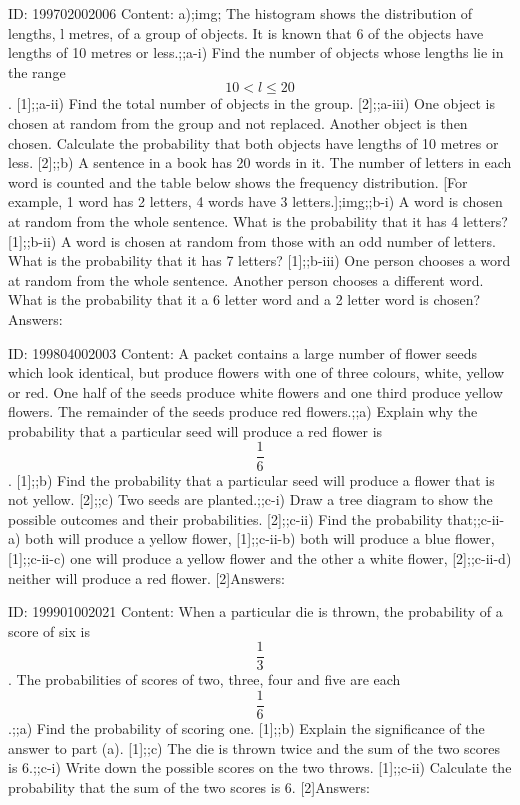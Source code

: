 \documentclass{article}
\begin{document}
ID: 199702002006
Content:
a);img; The histogram shows the distribution of lengths, l metres, of a group of objects. It is 	known that 6 of the objects have lengths of 10 metres or less.;;a-i) Find the number of objects whose lengths lie in the range $$10<l\leq20$$. [1];;a-ii) Find the total number of objects in the group. [2];;a-iii) One object is chosen at random from the group and not replaced. Another object is then chosen. Calculate the probability that both objects have lengths of 10 metres or less. [2];;b) A sentence in a book has 20 words in it. The number of letters in each word is counted and the table below shows the frequency distribution. [For example, 1 word has 2 letters, 4 words have 3 letters.];img;;b-i) A word is chosen at random from the whole sentence. What is the probability that it has 4 letters? [1];;b-ii) A word is chosen at random from those with an odd number of letters. What is the probability that it has 7 letters? [1];;b-iii) One person chooses a word at random from the whole sentence. Another person chooses a different word. What is the probability that it a 6 letter word and a 2 letter word is chosen?Answers:

ID: 199804002003
Content:
A packet contains a large number of flower seeds which look identical, but produce flowers with one of three colours, white, yellow or red. One half of the seeds produce white flowers and one third produce yellow flowers. The remainder of the seeds produce red flowers.;;a) Explain why the probability that a particular seed will produce a red flower is $$\frac{1}{6}$$. [1];;b) Find the probability that a particular seed will produce a flower that is not yellow. [2];;c) Two seeds are planted.;;c-i) Draw a tree diagram to show the possible outcomes and their probabilities. [2];;c-ii) Find the probability that;;c-ii-a) both will produce a yellow flower, [1];;c-ii-b) both will produce a blue flower, [1];;c-ii-c) one will produce a yellow flower and the other a white flower, [2];;c-ii-d) neither will produce a red flower. [2]Answers:

ID: 199901002021
Content:
When a particular die is thrown, the probability of a score of six is $$\frac{1}{3}$$. The probabilities of scores of two, three, four and five are each $$\frac{1}{6}$$.;;a) Find the probability of scoring one. [1];;b) Explain the significance of the answer to part (a). [1];;c) The die is thrown twice and the sum of the two scores is 6.;;c-i) Write down the possible scores on the two throws. [1];;c-ii) Calculate the probability that the sum of the two scores is 6. [2]Answers:
\end{document}
